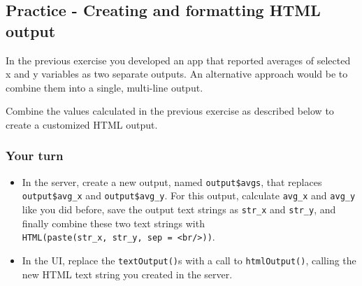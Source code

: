 \documentclass[
  letterpaper,
  DIV=11,
  numbers=noendperiod]{scrreprt}
\newenvironment{Shaded}{\begin{snugshade}}{\end{snugshade}}
\newcommand{\AttributeTok}[1]{\textcolor[rgb]{0.40,0.46,0.14}{#1}}
\newcommand{\CommentTok}[1]{\textcolor[rgb]{0.37,0.37,0.37}{#1}}
\newcommand{\ConstantTok}[1]{\textcolor[rgb]{0.56,0.35,0.01}{#1}}
\newcommand{\DecValTok}[1]{\textcolor[rgb]{0.68,0.00,0.00}{#1}}
\newcommand{\FunctionTok}[1]{\textcolor[rgb]{0.28,0.35,0.67}{#1}}
\newcommand{\NormalTok}[1]{\textcolor[rgb]{0.00,0.46,0.62}{#1}}
\newcommand{\OtherTok}[1]{\textcolor[rgb]{0.00,0.46,0.62}{#1}}
\newcommand{\SpecialCharTok}[1]{\textcolor[rgb]{0.37,0.37,0.37}{#1}}
\providecommand{\tightlist}{%
  \setlength{\itemsep}{0pt}\setlength{\parskip}{0pt}}
\begin{document}
\begin{Shaded}
\end{Shaded}

\hypertarget{practice---creating-and-formatting-html-output}{%
\subsection{Practice - Creating and formatting HTML
output}\label{practice---creating-and-formatting-html-output}}

In the previous exercise you developed an app that reported averages of
selected x and y variables as two separate outputs. An alternative
approach would be to combine them into a single, multi-line output.

Combine the values calculated in the previous exercise as described
below to create a customized HTML output.

\hypertarget{your-turn-14}{%
\subsubsection{Your turn}\label{your-turn-14}}

\begin{itemize}
\tightlist
\item
  In the server, create a new output, named \texttt{output\$avgs}, that
  replaces \texttt{output\$avg\_x} and \texttt{output\$avg\_y}. For this
  output, calculate \texttt{avg\_x} and \texttt{avg\_y} like you did
  before, save the output text strings as \texttt{str\_x} and
  \texttt{str\_y}, and finally combine these two text strings with
  \texttt{HTML(paste(str\_x,\ str\_y,\ sep\ =\ \textquotesingle{}\textless{}br/\textgreater{}\textquotesingle{}))}.
\item
  In the UI, replace the \texttt{textOutput()}s with a call to
  \texttt{htmlOutput()}, calling the new HTML text string you created in
  the server.
\end{itemize}
\end{document}
